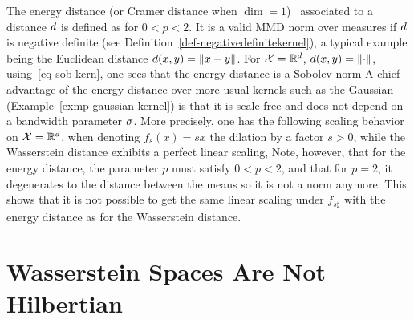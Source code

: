 \begin{example}\label{exp-energy-dist}
The energy distance (or Cramer distance when $\dim=1$)~\citep{szekely2004testing} associated to a distance $d$ is defined as
for $0 < p < 2$. 
%
It is a valid MMD norm over measures if $d$ is negative definite (see Definition~\ref{def-negativedefinitekernel}), a typical example being the Euclidean distance $d(x,y)=\left\| x-y \right\|$. 
%
For $\mathcal{X}=\mathbb{R}^d$, $d(x,y)=\left\| \cdot \right\|$, using~\eqref{eq-sob-kern}, one sees that the energy distance is a Sobolev norm
A chief advantage of the energy distance over more usual kernels such as the Gaussian (Example~\ref{exmp-gaussian-kernel}) is that it is scale-free and does not depend on a bandwidth parameter $\sigma$. More precisely, one has the following scaling behavior on $\mathcal{X}=\mathbb{R}^d$, when denoting $f_s(x)=sx$ the dilation by a factor $s>0$,
while the Wasserstein distance exhibits a perfect linear scaling,
Note, however, that for the energy distance, the parameter $p$ must satisfy $0 < p < 2$, and that for $p=2$, it degenerates to the distance between the means 
so it is not a norm anymore. This shows that it is not possible to get the same linear scaling under $f_{s\sharp}$ with the energy distance as for the Wasserstein distance. 
%
\end{example}





\section{Wasserstein Spaces Are Not Hilbertian}\label{sec-non-embeddability}

